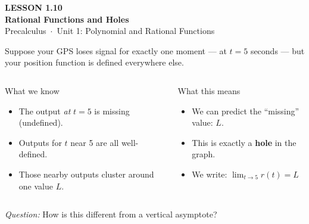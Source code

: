 \documentclass[aspectratio=169, 11pt]{beamer}
\begin{document}
{
\begin{frame}[plain]
  \vspace{2.8cm}\hspace{0.55cm}%
  \begin{minipage}{0.9\textwidth}
    {\color{goldacc}\bfseries\small LESSON 1.10}\\[0.5cm]
    {\color{white}\bfseries\LARGE Rational Functions and Holes}\\[1.2cm]
    {\color{skymid}\small Precalculus~$\cdot$~Unit 1: Polynomial and Rational Functions}
  \end{minipage}
\end{frame}
}

\begin{frame}[t, plain]

  Suppose your GPS loses signal for exactly one moment --- at $t = 5$ seconds --- but your
  position function is defined everywhere else.

  \bigskip
  \begin{columns}[T]
      \begin{block}{What we know}
        \begin{itemize}\setlength{\itemsep}{6pt}
          \item The output \textit{at} $t = 5$ is missing (undefined).
          \item Outputs for $t$ near 5 are all well-defined.
          \item Those nearby outputs cluster around one value $L$.
        \end{itemize}
      \end{block}

      \begin{block}{What this means}
        \begin{itemize}\setlength{\itemsep}{6pt}
          \item We can predict the ``missing'' value: $L$.
          \item This is exactly a \textbf{hole} in the graph.
          \item We write: $\displaystyle\lim_{t \to 5} r(t) = L$
        \end{itemize}
      \end{block}
  \end{columns}

  \bigskip
  \textit{Question:} How is this different from a vertical asymptote?
\end{frame}
\end{document}
